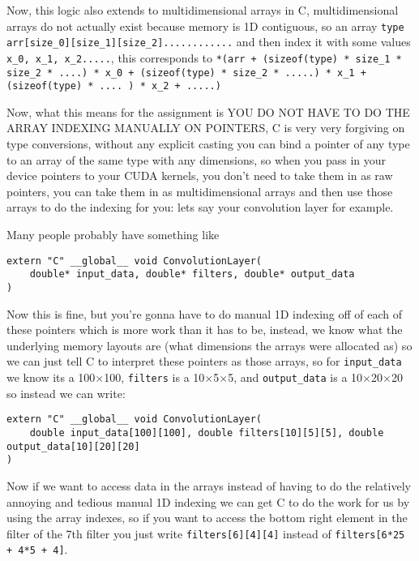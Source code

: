 Now, this logic also extends to multidimensional arrays in C, multidimensional arrays do not actually exist because memory is 1D contiguous, so an array \texttt{type arr[size\_0][size\_1][size\_2]............} and then index it with some values \texttt{x\_0, x\_1, x\_2.....}, this corresponds to \texttt{*(arr + (sizeof(type) * size\_1 * size\_2 * ....) * x\_0 + (sizeof(type) * size\_2 * .....) * x\_1 + (sizeof(type) * .... ) * x\_2 + .....)}

Now, what this means for the assignment is YOU DO NOT HAVE TO DO THE ARRAY INDEXING MANUALLY ON POINTERS, C is very very forgiving on type conversions, without any explicit casting you can bind a pointer of any type to an array of the same type with any dimensions, so when you pass in your device pointers to your CUDA kernels, you don't need to take them in as raw pointers, you can take them in as multidimensional arrays and then use those arrays to do the indexing for you: lets say your convolution layer for example.

Many people probably have something like

\begin{verbatim}
extern "C" __global__ void ConvolutionLayer(
    double* input_data, double* filters, double* output_data
)
\end{verbatim}

Now this is fine, but you're gonna have to do manual 1D indexing off of each of these pointers which is more work than it has to be, instead, we know what the underlying memory layouts are (what dimensions the arrays were allocated as) so we can just tell C to interpret these pointers as those arrays, so for \texttt{input\_data} we know its a 100$\times$100, \texttt{filters} is a 10$\times$5$\times$5, and \texttt{output\_data} is a 10$\times$20$\times$20 so instead we can write:

\begin{verbatim}
extern "C" __global__ void ConvolutionLayer(
    double input_data[100][100], double filters[10][5][5], double output_data[10][20][20]
)
\end{verbatim}

Now if we want to access data in the arrays instead of having to do the relatively annoying and tedious manual 1D indexing we can get C to do the work for us by using the array indexes, so if you want to access the bottom right element in the filter of the 7th filter you just write \texttt{filters[6][4][4]}
instead of
\texttt{filters[6*25 + 4*5 + 4]}.


